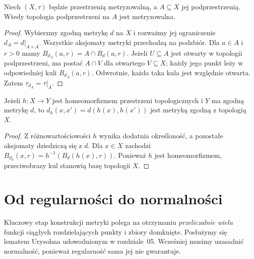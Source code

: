 \begin{twierdzenie}
\label{thm:topog-metryzowalnosc-podprzestrzenie}
Niech $(X,\tau)$ będzie przestrzenią metryzowalną,
a $A\subseteq X$ jej podprzestrzenią. Wtedy topologia
podprzestrzeni na $A$ jest metryzowalna.
\end{twierdzenie}
\begin{proof}
Wybierzmy zgodną metrykę $d$ na $X$ i rozważmy jej
ograniczenie $d_A=d|_{A\times A}$. Wszystkie aksjomaty
metryki przechodzą na podzbiór. Dla $a\in A$ i $r>0$
mamy $B_{d_A}(a,r)=A\cap B_d(a,r)$.
Jeżeli $U\subseteq A$ jest otwarty w topologii podprzestrzeni,
ma postać $A\cap V$ dla otwartego $V\subseteq X$;
każdy jego punkt leży w odpowiedniej kuli $B_{d_A}(a,r)$.
Odwrotnie, każda taka kula jest względnie otwarta.
Zatem $\tau_{d_A}=\tau|_A$.
\end{proof}

\begin{stwierdzenie}
\label{prop:topog-metryzowalnosc-homeo}
Jeżeli $h\colon X\to Y$ jest homeomorfizmem przestrzeni
topologicznych i $Y$ ma zgodną metrykę $d$, to
$d_h(x,x')=d(h(x),h(x'))$ jest metryką zgodną z topologią $X$.
\end{stwierdzenie}
\begin{proof}
Z różnowartościowości $h$ wynika dodatnia określoność,
a pozostałe aksjomaty dziedziczą się z $d$.
Dla $x\in X$ zachodzi
$B_{d_h}(x,r)=h^{-1}(B_d(h(x),r))$.
Ponieważ $h$ jest homeomorfizmem, przeciwobrazy kul
stanowią bazę topologii $X$.
\end{proof}

\section{Od regularności do normalności}
\label{sec:topog-t3-drugi-normalna}

Kluczowy etap konstrukcji metryki polega na otrzymaniu
\emph{przeliczalnie wielu} funkcji ciągłych rozdzielających
punkty i zbiory domknięte. Posłużymy się lematem Urysohna
udowodnionym w rozdziale~05. Wcześniej musimy uzasadnić
normalność, ponieważ regularność sama jej nie gwarantuje.

